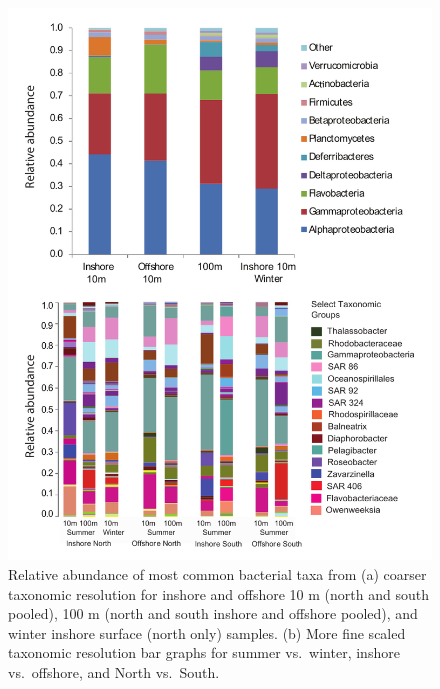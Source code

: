 \begin{figure}[htbp] 
\centering 
\includegraphics[width=1.0\textwidth]{Chapter_2_MIRADA/Figures/Supplemental_1_Qiime_taxonomic_summary} 
\caption[Relative abundance of most common bacterial taxa from different sets of sites.]{Relative abundance of most common bacterial taxa from (a) coarser taxonomic resolution for inshore and offshore 10 m (north and south pooled), 100 m (north and south inshore and offshore pooled), and winter inshore surface (north only) samples. (b) More fine scaled taxonomic resolution bar graphs for summer vs.~winter, inshore vs.~offshore, and North vs.~South.} 
\label{fig:ch1:supp1} 
\end{figure}


